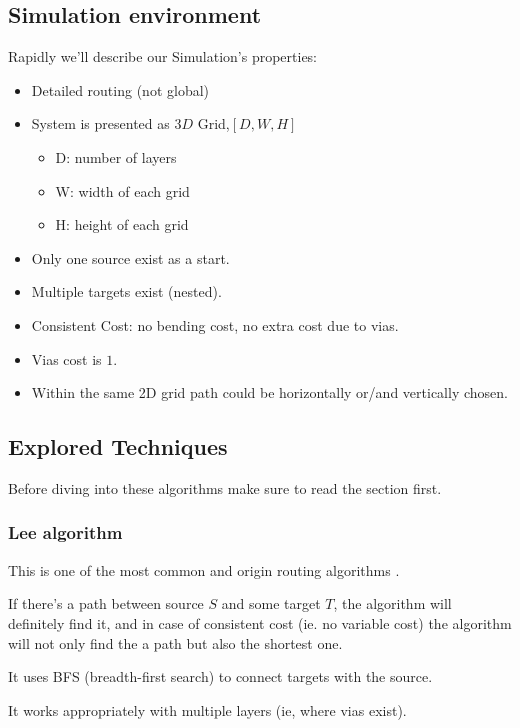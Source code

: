 \subsection{Simulation environment}
    Rapidly we'll describe our Simulation's properties:
    \begin{itemize}
        \item Detailed routing (not global)
        \item System is presented as $3D$ Grid,$[D, W, H]$
        \begin{itemize}
            \item D: number of layers 
            \item W: width of each grid
            \item H: height of each grid
        \end{itemize}
        \item Only one source exist as a start.
        \item Multiple targets exist (nested).          
        \item Consistent Cost: no bending cost, no extra cost due to vias.
        \item Vias cost is $1$.
        \item Within the same 2D grid path could be horizontally or/and vertically
            chosen.
    \end{itemize}

\subsection{Explored Techniques}
    Before diving into these algorithms make sure to read the  section first.
    \newline

    \subsubsection{Lee algorithm}
    \label{LeeSection}
    This is one of the most common and origin routing algorithms \cite{LeeRef}.

    If there's a path between source $S$ and some target $T$, the algorithm will definitely find it,
    and in case of consistent cost (ie. no variable cost) the algorithm will not only find the 
    a path but also the shortest one.

    It uses BFS (breadth-first search) to connect targets with the source.

    It works appropriately with multiple layers (ie, where vias exist).

